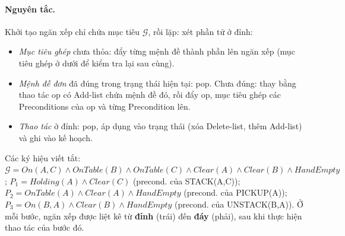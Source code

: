 \documentclass[a4paper,11pt]{article}
\newcommand{\On}[2]{\mathit{On}(#1,#2)}
\newcommand{\OnT}[1]{\mathit{OnTable}(#1)}
\newcommand{\Clr}[1]{\mathit{Clear}(#1)}
\newcommand{\Hold}[1]{\mathit{Holding}(#1)}
\newcommand{\HE}{\mathit{HandEmpty}}
\newcommand{\PrA}{\Hold{A}\wedge\Clr{C}}
\newcommand{\PrB}{\OnT{A}\wedge\Clr{A}\wedge\HE}
\newcommand{\PrC}{\On{B}{A}\wedge\Clr{B}\wedge\HE}
\begin{document}
\paragraph{Nguyên tắc.} Khởi tạo ngăn xếp chỉ chứa mục tiêu $\mathcal{G}$, rồi lặp: xét phần tử ở đỉnh:
\begin{itemize}[nosep]
  \item \emph{Mục tiêu ghép} chưa thỏa: đẩy từng mệnh đề thành phần lên ngăn xếp (mục tiêu ghép ở dưới để kiểm tra lại sau cùng).
  \item \emph{Mệnh đề đơn} đã đúng trong trạng thái hiện tại: pop. Chưa đúng: thay bằng thao tác $\mathrm{op}$ có Add-list chứa mệnh đề đó, rồi đẩy $\mathrm{op}$, mục tiêu ghép các Preconditions của $\mathrm{op}$ và từng Precondition lên.
  \item \emph{Thao tác} ở đỉnh: pop, áp dụng vào trạng thái (xóa Delete-list, thêm Add-list) và ghi vào kế hoạch.
\end{itemize}
Các ký hiệu viết tắt:
$\mathcal{G}=\On{A}{C}\wedge\OnT{B}\wedge\OnT{C}\wedge\Clr{A}\wedge\Clr{B}\wedge\HE$;
$P_1=\PrA$ (precond. của STACK(A,C));
$P_2=\PrB$ (precond. của PICKUP(A));
$P_3=\PrC$ (precond. của UNSTACK(B,A)).
Ở mỗi bước, ngăn xếp được liệt kê từ \textbf{đỉnh} (trái) đến \textbf{đáy} (phải), sau khi thực hiện thao tác của bước đó.
\end{document}
